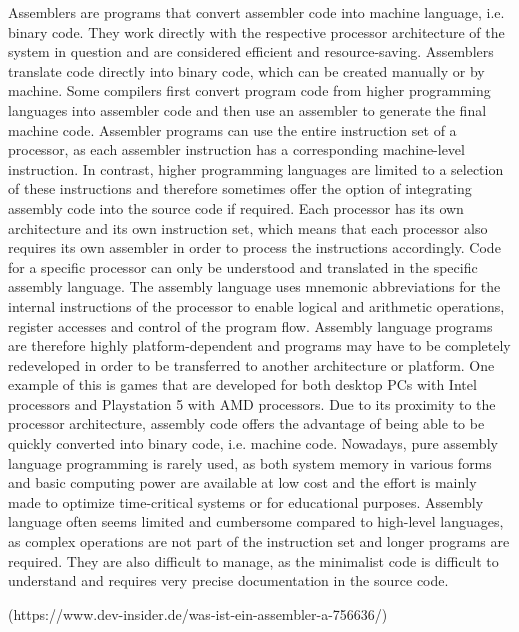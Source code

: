 Assemblers are programs that convert assembler code into machine language, i.e. binary code. They work directly with the respective processor architecture of the system in question and are considered efficient and resource-saving. Assemblers translate code directly into binary code, which can be created manually or by machine. Some compilers first convert program code from higher programming languages into assembler code and then use an assembler to generate the final machine code.
Assembler programs can use the entire instruction set of a processor, as each assembler instruction has a corresponding machine-level instruction. In contrast, higher programming languages are limited to a selection of these instructions and therefore sometimes offer the option of integrating assembly code into the source code if required.
Each processor has its own architecture and its own instruction set, which means that each processor also requires its own assembler in order to process the instructions accordingly. Code for a specific processor can only be understood and translated in the specific assembly language. The assembly language uses mnemonic abbreviations for the internal instructions of the processor to enable logical and arithmetic operations, register accesses and control of the program flow. Assembly language programs are therefore highly platform-dependent and programs may have to be completely redeveloped in order to be transferred to another architecture or platform. One example of this is games that are developed for both desktop PCs with Intel processors and Playstation 5 with AMD processors.
Due to its proximity to the processor architecture, assembly code offers the advantage of being able to be quickly converted into binary code, i.e. machine code. 
Nowadays, pure assembly language programming is rarely used, as both system memory in various forms and basic computing power are available at low cost and the effort is mainly made to optimize time-critical systems or for educational purposes. Assembly language often seems limited and cumbersome compared to high-level languages, as complex operations are not part of the instruction set and longer programs are required. They are also difficult to manage, as the minimalist code is difficult to understand and requires very precise documentation in the source code.

(https://www.dev-insider.de/was-ist-ein-assembler-a-756636/)
